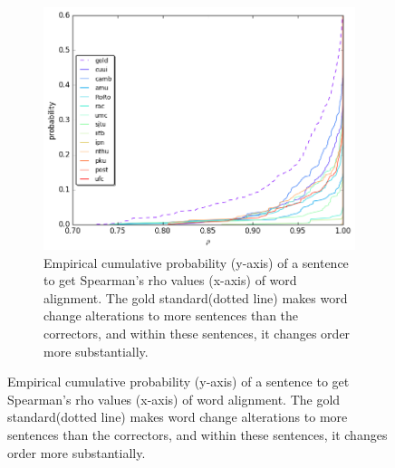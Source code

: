\documentclass[letter,11pt]{article}
\newcommand{\com}[1]{}
\begin{document}
{\begin{figure}
  \begin{subfigure}[]{0.4\textwidth}
  	\com{\caption{\label{fig:rho}}}
    \includegraphics[width = \textwidth]{spearman_ecdf}
    \caption{Empirical cumulative probability (y-axis) of a sentence to get Spearman's rho values (x-axis) of word alignment. The gold standard(dotted line) makes word change alterations to more sentences than the correctors, and within these sentences, it changes order more substantially.\label{fig:rho}}
  \end{subfigure}


\end{figure}}
\end{document}
